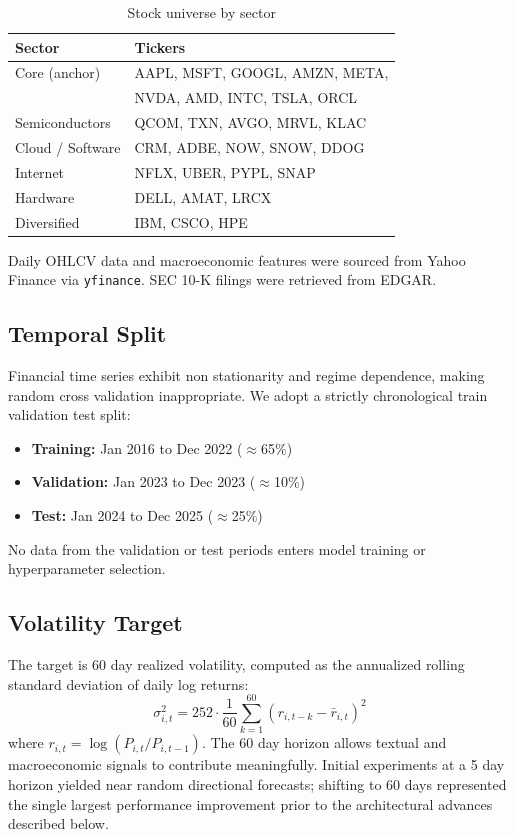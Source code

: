 \documentclass[10pt, twocolumn, a4paper]{article}
\begin{document}
\begin{table}[H]
\centering
\small
\caption{Stock universe by sector}
\label{tab:stocks}
\begin{tabular}{ll}
\toprule
\textbf{Sector} & \textbf{Tickers} \\
\midrule
Core (anchor)      & AAPL, MSFT, GOOGL, AMZN, META, \\
                   & NVDA, AMD, INTC, TSLA, ORCL \\
Semiconductors     & QCOM, TXN, AVGO, MRVL, KLAC \\
Cloud / Software   & CRM, ADBE, NOW, SNOW, DDOG \\
Internet           & NFLX, UBER, PYPL, SNAP \\
Hardware           & DELL, AMAT, LRCX \\
Diversified        & IBM, CSCO, HPE \\
\bottomrule
\end{tabular}
\end{table}

Daily OHLCV data and macroeconomic features were sourced from Yahoo Finance
via \texttt{yfinance}. SEC 10{-}K filings were retrieved from EDGAR.

\subsection{Temporal Split}

Financial time series exhibit non stationarity and regime dependence, making
random cross validation inappropriate. We adopt a strictly chronological
train validation test split:

\begin{itemize}[noitemsep, topsep=2pt, leftmargin=*]
    \item \textbf{Training:} Jan 2016 to Dec 2022 ($\approx$65\%)
    \item \textbf{Validation:} Jan 2023 to Dec 2023 ($\approx$10\%)
    \item \textbf{Test:} Jan 2024 to Dec 2025 ($\approx$25\%)
\end{itemize}

No data from the validation or test periods enters model training or
hyperparameter selection.

\subsection{Volatility Target}

The target is 60 day realized volatility, computed as the annualized
rolling standard deviation of daily log returns:
\begin{equation}
    \sigma^2_{i,t} = 252 \cdot \frac{1}{60} \sum_{k=1}^{60}
    \left( r_{i,t-k} - \bar{r}_{i,t} \right)^2
\end{equation}
where $r_{i,t} = \log(P_{i,t} / P_{i,t-1})$. The 60 day horizon allows
textual and macroeconomic signals to contribute meaningfully. Initial
experiments at a 5 day horizon yielded near random directional forecasts;
shifting to 60 days represented the single largest performance
improvement prior to the architectural advances described below.
\end{document}
